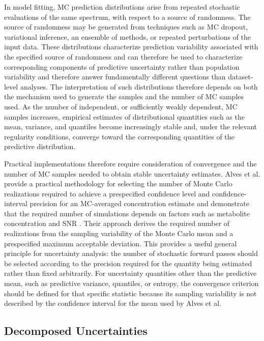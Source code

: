 In \DL model fitting, MC prediction distributions arise from repeated stochastic evaluations of the same spectrum, with respect to a source of randomness. The source of randomness may be generated from techniques such as MC dropout, variational inference, an ensemble of methods, or repeated perturbations of the input data. These distributions characterize prediction variability associated with the specified source of randomness and can therefore be used to characterize corresponding components of predictive uncertainty rather than population variability and therefore answer fundamentally different questions than dataset-level analyses. The interpretation of such distributions therefore depends on both the mechanism used to generate the samples and the number of MC samples used. As the number of independent, or sufficiently weakly dependent, MC samples increases, empirical estimates of distributional quantities such as the mean, variance, and quantiles become increasingly stable and, under the relevant regularity conditions, converge toward the corresponding quantities of the predictive distribution.

Practical implementations therefore require consideration of convergence and the number of MC samples needed to obtain stable uncertainty estimates. Alves et al. provide a practical methodology for selecting the number of Monte Carlo realizations required to achieve a prespecified confidence level and confidence-interval precision for an MC-averaged concentration estimate and demonstrate that the required number of simulations depends on factors such as metabolite concentration and SNR \cite{Alves2024}. Their approach derives the required number of realizations from the sampling variability of the Monte Carlo mean and a prespecified maximum acceptable deviation. This provides a useful general principle for \DL uncertainty analysis: the number of stochastic forward passes should be selected according to the precision required for the quantity being estimated rather than fixed arbitrarily. For uncertainty quantities other than the predictive mean, such as predictive variance, quantiles, or entropy, the convergence criterion should be defined for that specific statistic because its sampling variability is not described by the confidence interval for the mean used by Alves et al.

\subsection{Decomposed Uncertainties}
